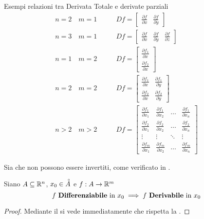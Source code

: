 \begin{example}
	\label{ex:Df_e_deriv_parz}
	Esempi relazioni tra Derivata Totale e derivate parziali
	\begin{align*}
		n = 2 \quad m = 1 \qquad & Df =
		\begin{bmatrix}
			\frac{\partial f}{\partial x} & \frac{\partial f}{\partial y}
		\end{bmatrix}\\
		n = 3 \quad m = 1 \qquad & Df =
		\begin{bmatrix}
			\frac{\partial f}{\partial x} & \frac{\partial f}{\partial y} &  \frac{\partial f}{\partial z}
		\end{bmatrix}\\
		n = 1 \quad m = 2 \qquad & Df =
		\begin{bmatrix}
			\frac{\partial f_1}{\partial x}\\[1ex]
			\frac{\partial f_2}{\partial x}
		\end{bmatrix}\\
		n = 2 \quad m = 2 \qquad & Df =
		\begin{bmatrix}
			\frac{\partial f_1}{\partial x} & \frac{\partial f_1}{\partial y}\\[1ex]
			\frac{\partial f_2}{\partial x} & \frac{\partial f_2}{\partial y}
		\end{bmatrix}\\
		n > 2 \quad m > 2 \qquad & Df =
		\begin{bmatrix}
			\frac{\partial f_1}{\partial x_1} & \frac{\partial f_1}{\partial x_2} & \dots & \frac{\partial f_1}{\partial x_n}\\[1ex]
			\frac{\partial f_2}{\partial x_1} & \frac{\partial f_2}{\partial x_2} & \dots & \frac{\partial f_2}{\partial x_n}\\[1ex]
			\vdots & \vdots & \ddots & \vdots\\[1ex]
			\frac{\partial f_m}{\partial x_1} & \frac{\partial f_m}{\partial x_2} & \dots & \frac{\partial f_m}{\partial x_n}
		\end{bmatrix}
	\end{align*}
\end{example}
\begin{observation}
	Sia  che  non possono essere invertiti, come verificato in .
\end{observation}
\begin{corollary}
	Siano $A \subseteq \mathbb{R}^n$, $x_0 \in \accentset{\circ}{A}$ e $f:A \to \mathbb{R}^m$
	\[f \text{ \textbf{Differenziabile} in } x_0 \implies f \text{ \textbf{Derivabile} in } x_0\]
	\begin{proof}
		Mediante il  si vede immediatamente che rispetta la .
	\end{proof}
\end{corollary}
